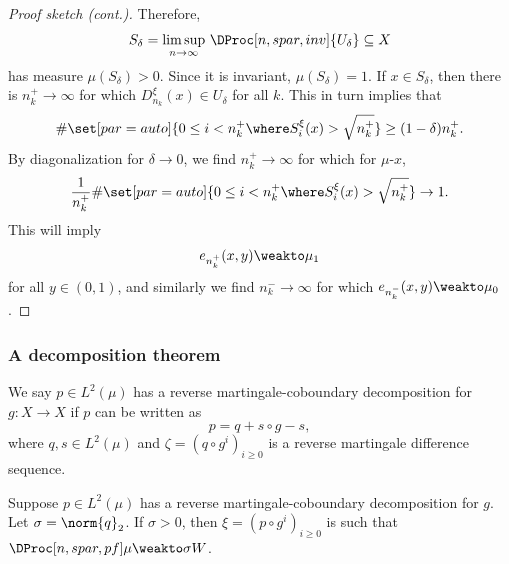 \documentclass[shortlabels, 9pt, aspectratio=2013]{beamer}
\begin{document}
\begin{frame}
  \begin{proof}[Proof sketch (cont.)]
    Therefore,
    \begin{equation*}
      S_{\delta} = \limsup_{n \to \infty}\, \DProc[n,spar,inv]{U_{\delta}} \subseteq X
    \end{equation*}
    has measure \(\mu(S_{\delta}) > 0\). Since it is invariant, \(\mu(S_{\delta}) = 1\). If \(x \in S_{\delta}\), then there is \(n_k^+ \to \infty\) for which \(D_{n_k}^{\xi}(x) \in U_{\delta}\) for all \(k\). This in turn implies that
    \begin{align*}
      \#\set[par = auto]{ 0 \leq i < n_k^+ \where S_{i}^{\xi}(x) > \sqrt{\textstyle n^+_k} } \geq (1 - \delta)n_k^{+}.
    \end{align*}
    By diagonalization for \(\delta \to 0\), we find \(n^+_k \to \infty\) for which for \(\mu\)-\almostevery \(x\),
    \begin{equation*}
      \frac{1}{n_k^+}\#\set[par = auto]{ 0 \leq i < n_k^+ \where S_{i}^{\xi}(x) > \sqrt{\textstyle n^+_k} } \to 1.
    \end{equation*}
    This will imply
    \[e_{n^+_k}(x,y) \weakto \mu_1\]
    for all \(y \in (0,1)\), and similarly we find \(n^-_k \to \infty\) for which \(e_{n^-_k}(x,y) \weakto \mu_0\).
  \end{proof}

\end{frame}

\begin{frame}
  \frametitle{A decomposition theorem}
  \begin{definition}
    We say \(p \in L^2(\mu)\) has a reverse martingale-coboundary decomposition for \(g \colon X \to X\) if \(p\) can be written as
    \begin{equation*}
      p = q + s \circ g - s,
    \end{equation*}
    where \(q,s \in L^2(\mu)\) and \(\zeta = (q \circ g^i)_{i \geq 0}\) is a reverse martingale difference sequence.
  \end{definition}
  \begin{lemma}\label{thm:martingale-coboundary}
    Suppose \(p \in L^2(\mu)\) has a reverse martingale-coboundary decomposition for \(g\). Let \(\sigma = \norm{q}_2 \). If \(\sigma > 0\), then \(\xi = (p \circ g^i)_{i \ge 0}\) is such that \(\DProc[n,spar,pf]\mu \weakto \sigma W\).
  \end{lemma}
\end{frame}
\end{document}
